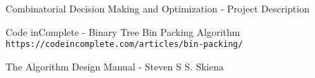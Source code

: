 \begin{thebibliography}{2}
        Combinatorial Decision Making and Optimization - Project Description
    
        Code inComplete - Binary Tree Bin Packing Algorithm
        \texttt{https://codeincomplete.com/articles/bin-packing/}
    
        The Algorithm Design Manual - Steven S S. Skiena 
\end{thebibliography}